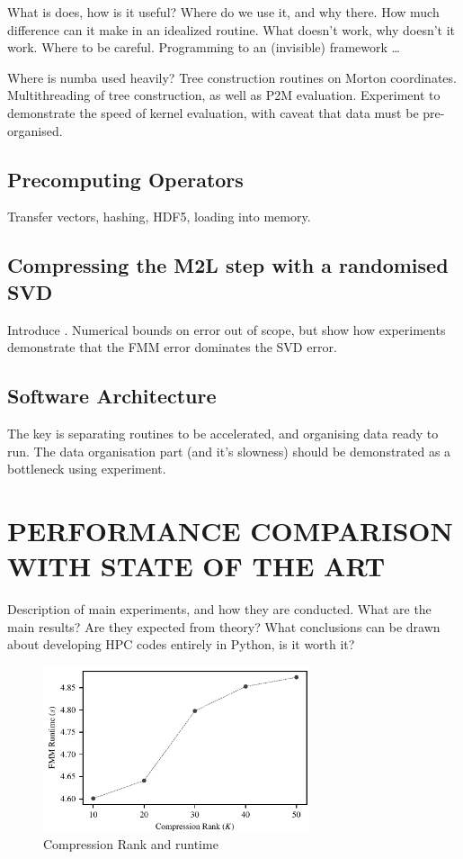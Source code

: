 \documentclass{IEEEcsmag}
\begin{document}
What is does, how is it useful? Where do we use it, and why there. How much difference can it make in an idealized routine. What doesn't work, why doesn't it work. Where to be careful. Programming to an (invisible) framework \dots

Where is numba used heavily? Tree construction routines on Morton coordinates. Multithreading of tree construction, as well as P2M evaluation. Experiment to demonstrate the speed of kernel evaluation, with caveat that data must be pre-organised.

\subsection{Precomputing Operators}

Transfer vectors, hashing, HDF5, loading into memory.

\subsection{Compressing the M2L step with a randomised SVD}

Introduce \cite{Ying2004}. Numerical bounds on error out of scope, but show how experiments demonstrate that the FMM error dominates the SVD error.

\subsection{Software Architecture}

The key is separating routines to be accelerated, and organising data ready to run. The data organisation part (and it's slowness) should be demonstrated as a bottleneck using experiment.

\section{PERFORMANCE COMPARISON WITH STATE OF THE ART}

Description of main experiments, and how they are conducted. What are the main results? Are they expected from theory? What conclusions can be drawn about developing HPC codes entirely in Python, is it worth it?

\begin{figure}
\centerline{\includegraphics[width=18.5pc]{figures/compression_runtime.pdf}}
\caption{Compression Rank and runtime}
\end{figure}
\end{document}

